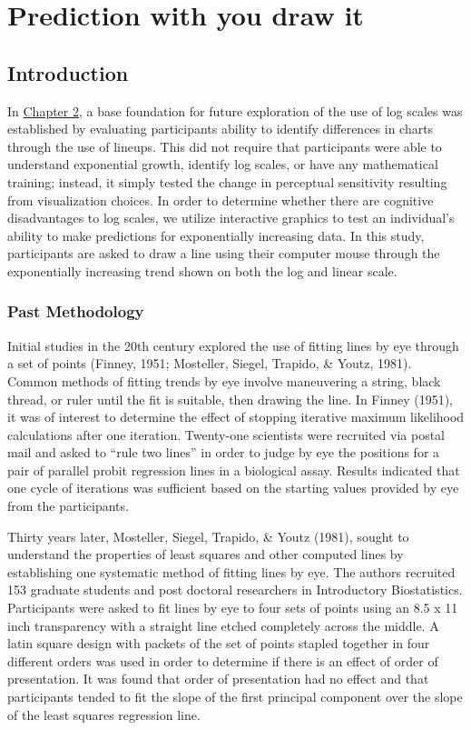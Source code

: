 \documentclass[print]{nuthesis}
\begin{document}
\hypertarget{youdrawit}{%
\chapter{Prediction with you draw it}\label{youdrawit}}

\hypertarget{introduction-1}{%
\section{Introduction}\label{introduction-1}}

In \protect\hyperlink{lineups}{Chapter 2}, a base foundation for future exploration of the use of log scales was established by evaluating participants ability to identify differences in charts through the use of lineups.
This did not require that participants were able to understand exponential growth, identify log scales, or have any mathematical training; instead, it simply tested the change in perceptual sensitivity resulting from visualization choices.
In order to determine whether there are cognitive disadvantages to log scales, we utilize interactive graphics to test an individual's ability to make predictions for exponentially increasing data. In this study, participants are asked to draw a line using their computer mouse through the exponentially increasing trend shown on both the log and linear scale.

\hypertarget{past-methodology}{%
\subsection{Past Methodology}\label{past-methodology}}

Initial studies in the 20th century explored the use of fitting lines by eye through a set of points (Finney, 1951; Mosteller, Siegel, Trapido, \& Youtz, 1981).
Common methods of fitting trends by eye involve maneuvering a string, black thread, or ruler until the fit is suitable, then drawing the line.
In Finney (1951), it was of interest to determine the effect of stopping iterative maximum likelihood calculations after one iteration. Twenty-one scientists were recruited via postal mail and asked to ``rule two lines'' in order to judge by eye the positions for a pair of parallel probit regression lines in a biological assay.
Results indicated that one cycle of iterations was sufficient based on the starting values provided by eye from the participants.

Thirty years later, Mosteller, Siegel, Trapido, \& Youtz (1981), sought to understand the properties of least squares and other computed lines by establishing one systematic method of fitting lines by eye.
The authors recruited 153 graduate students and post doctoral researchers in Introductory Biostatistics.
Participants were asked to fit lines by eye to four sets of points using an 8.5 x 11 inch transparency with a straight line etched completely across the middle.
A latin square design with packets of the set of points stapled together in four different orders was used in order to determine if there is an effect of order of presentation.
It was found that order of presentation had no effect and that participants tended to fit the slope of the first principal component over the slope of the least squares regression line.
\end{document}
